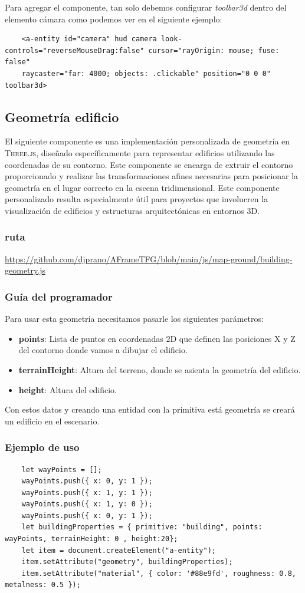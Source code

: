 \documentclass[a4paper, 11pt]{book}
\begin{document}
Para agregar el componente, tan solo debemos configurar \emph{toolbar3d} dentro del elemento cámara como podemos ver en el siguiente ejemplo:
\begin{verbatim}
	<a-entity id="camera" hud camera look-controls="reverseMouseDrag:false" cursor="rayOrigin: mouse; fuse: false"
	raycaster="far: 4000; objects: .clickable" position="0 0 0" toolbar3d>
\end{verbatim}
\subsection{Geometría edificio}
El siguiente componente es una implementación personalizada de geometría en \textsc{Three.js}, diseñado específicamente para representar edificios utilizando las coordenadas de su contorno. Este componente se encarga de extruir el contorno proporcionado y realizar las transformaciones afines necesarias para posicionar la geometría en el lugar correcto en la escena tridimensional.
Este componente personalizado resulta especialmente útil para proyectos que involucren la visualización de edificios y estructuras arquitectónicas en entornos 3D.
\subsubsection{ruta}
{\scriptsize
	\url{https://github.com/djprano/AFrameTFG/blob/main/js/map-ground/building-geometry.js}
}
\subsubsection{Guía del programador}
Para usar esta geometría necesitamos pasarle los siguientes parámetros:
\begin{itemize}
	\item \textbf{points}: Lista de puntos en coordenadas 2D que definen las posiciones X y Z del contorno donde vamos a dibujar el edificio.
	\item \textbf{terrainHeight}: Altura del terreno, donde se asienta la geometría del edificio.
	\item \textbf{height}: Altura del edificio.
\end{itemize}
Con estos datos y creando una entidad con la primitiva está geometría se creará un edificio en el escenario.
\subsubsection{Ejemplo de uso}
\begin{verbatim}
	let wayPoints = [];
	wayPoints.push({ x: 0, y: 1 });
	wayPoints.push({ x: 1, y: 1 });
	wayPoints.push({ x: 1, y: 0 });
	wayPoints.push({ x: 0, y: 1 });
	let buildingProperties = { primitive: "building", points: wayPoints, terrainHeight: 0 , height:20};
	let item = document.createElement("a-entity");
	item.setAttribute("geometry", buildingProperties);
	item.setAttribute("material", { color: '#88e9fd', roughness: 0.8, metalness: 0.5 });
	
\end{verbatim}
\end{document}
